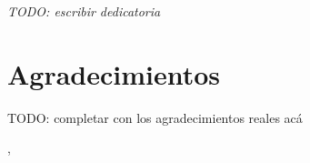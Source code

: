 
\newpage
\thispagestyle{plain}
\vspace*{5cm}
\begin{flushright}
\itshape
% 
TODO: escribir dedicatoria\\[0.5em]
\end{flushright}

\newpage

\chapter*{Agradecimientos}

% 
TODO: completar con los agradecimientos reales acá




\vspace{2em}
\noindent\ciudadTesis, \anioTesis
